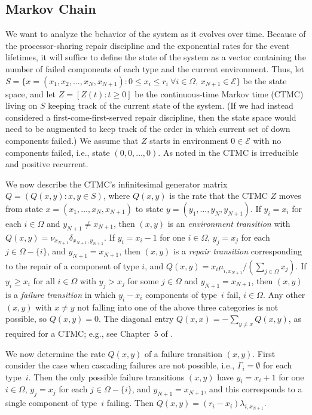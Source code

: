 \documentclass[12pt]{article}
\begin{document}
\subsection{Markov Chain}
\label{sec:ctmc}

We want to analyze the behavior of the system as it evolves over time.  Because
of the processor-sharing repair discipline and the exponential rates for the
event lifetimes, it will suffice to define the state of the system as a vector
containing the number of failed components of each type and the current
environment. Thus, let $S = \{ x = (x_1, x_2, \ldots, x_N, x_{N + 1}) : 0 \leq
x_i \leq r_i \ \forall i \in \Omega, \, x_{N + 1} \in \mathcal{E} \}$ be the
state space, and let $Z = [Z(t) : t \geq 0]$ be the continuous-time Markov time
(CTMC) living on $S$ keeping track of the current state of the system. (If we
had instead considered a first-come-first-served repair discipline, then the
state space would need to be augmented to keep track of the order in which
current set of down components failed.) We assume that $Z$ starts in environment
$0 \in \mathcal{E}$ with no components failed, i.e., state $(0,0, \ldots, 0)$.
As noted in \cite{ING:2009} the CTMC is irreducible and positive recurrent.

We now describe the CTMC's infinitesimal generator matrix $Q = (Q(x, y) : x, y
\in S)$, where $Q(x, y)$ is the rate that the CTMC $Z$ moves from state $x =
(x_1, \ldots, x_N, x_{N + 1})$ to state $y = (y_1, \ldots, y_N, y_{N + 1})$. If
$y_i = x_i$ for each $i \in \Omega$ and $y_{N + 1} \neq x_{N + 1}$, then $(x,
y)$ is an \textit{environment transition} with $Q(x, y) = \nu_{x_{N + 1}}
\delta_{x_{N + 1},y_{N + 1}}$. If $y_i = x_i - 1$ for one $i \in \Omega$, $y_j =
x_j$ for each $j \in \Omega - \{ i \}$, and $y_{N + 1} = x_{N + 1}$, then $(x,
y)$ is a \textit{repair transition} corresponding to the repair of a component
of type $i$, and $Q(x, y) = x_i \mu_{i,x_{N + 1}}/(\sum_{j \in \Omega} x_j)$. If
$y_i \geq x_i$ for all $i \in \Omega$ with $y_j > x_j$ for some $j \in \Omega$
and $y_{N + 1} = x_{N + 1}$, then $(x, y)$ is a \textit{failure transition} in
which $y_i - x_i$ components of type~$i$ fail, $i \in \Omega$. Any other $(x,
y)$ with $x \neq y$ not falling into one of the above three categories is not
possible, so $Q(x, y) = 0$. The diagonal entry $Q(x, x) = -\sum_{y \neq x} Q(x,
y)$, as required for a CTMC; e.g., see Chapter~5 of 
\cite{Ross:1995}.

We now determine the rate $Q(x, y)$ of a failure transition $(x, y)$. First
consider the case when cascading failures are not possible, i.e., $\Gamma_i =
\emptyset$ for each type~$i$. Then the only possible failure transitions $(x ,
y)$ have $y_i = x_i + 1$ for one $i \in \Omega$, $y_j = x_j$ for each $j \in
\Omega - \{ i \}$, and $y_{N + 1} = x_{N + 1}$, and this corresponds to a single
component of type~$i$ failing. Then $Q(x, y) = (r_i - x_i) \lambda_{i, x_{N +
1}}$.
\end{document}
